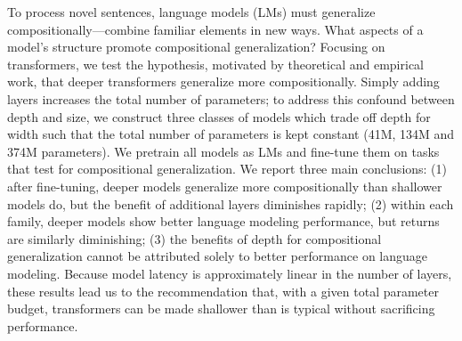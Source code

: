 To process novel sentences, language models (LMs) must generalize compositionally---combine familiar elements in new ways. What aspects of a model's structure promote compositional generalization? Focusing on transformers, we test the hypothesis, motivated by theoretical and empirical work, that deeper transformers generalize more compositionally. Simply adding layers increases the total number of parameters; to address this confound between depth and size, we construct three classes of models which trade off depth for width such that the total number of parameters is kept constant (41M, 134M and 374M parameters). We pretrain all models as LMs and fine-tune them on tasks that test for compositional generalization. We report three main conclusions: (1) after fine-tuning, deeper models generalize more compositionally than shallower models do, but the benefit of additional layers diminishes rapidly; (2) within each family, deeper models show better language modeling performance, but returns are similarly diminishing; (3) the benefits of depth for compositional generalization cannot be attributed solely to better performance on language modeling. Because model latency is approximately linear in the number of layers, these results lead us to the recommendation that, with a given total parameter budget, transformers can be made shallower than is typical without sacrificing performance.